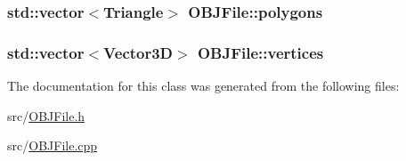 \subsubsection[{\texorpdfstring{polygons}{polygons}}]{\setlength{\rightskip}{0pt plus 5cm}std\+::vector$<${\bf Triangle}$>$ O\+B\+J\+File\+::polygons\hspace{0.3cm}{\ttfamily [private]}}\hypertarget{classOBJFile_a7d568b98c43fd96142d9f0f0e57b296e}{}\label{classOBJFile_a7d568b98c43fd96142d9f0f0e57b296e}
\subsubsection[{\texorpdfstring{vertices}{vertices}}]{\setlength{\rightskip}{0pt plus 5cm}std\+::vector$<${\bf Vector3D}$>$ O\+B\+J\+File\+::vertices\hspace{0.3cm}{\ttfamily [private]}}\hypertarget{classOBJFile_a9b07010eef35e7d44250f5f4f8fa3428}{}\label{classOBJFile_a9b07010eef35e7d44250f5f4f8fa3428}


The documentation for this class was generated from the following files\+:\begin{DoxyCompactItemize}
\item 
src/\hyperlink{OBJFile_8h}{O\+B\+J\+File.\+h}\item 
src/\hyperlink{OBJFile_8cpp}{O\+B\+J\+File.\+cpp}\end{DoxyCompactItemize}
